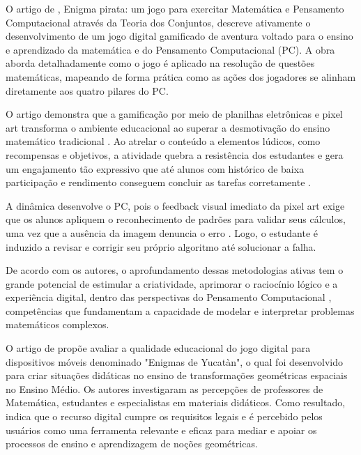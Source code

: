 O artigo de \cite{lais2023}, Enigma pirata: um jogo para exercitar Matemática e Pensamento
Computacional através da Teoria dos Conjuntos, descreve ativamente o
desenvolvimento de um jogo digital gamificado de aventura voltado para o ensino
e aprendizado da matemática e do Pensamento Computacional (PC). A obra aborda
detalhadamente como o jogo é aplicado na resolução de questões matemáticas,
mapeando de forma prática como as ações dos jogadores se alinham diretamente aos
quatro pilares do PC.

O artigo demonstra que a gamificação por meio de planilhas eletrônicas e pixel
art transforma o ambiente educacional ao superar a desmotivação do ensino
matemático tradicional \cite{teodosio2023atividade}. Ao atrelar o conteúdo a
elementos lúdicos, como recompensas e objetivos, a atividade quebra a
resistência dos estudantes e gera um engajamento tão expressivo que até alunos
com histórico de baixa participação e rendimento conseguem concluir as tarefas
corretamente \cite{teodosio2023atividade}.

A dinâmica desenvolve o PC, pois o feedback visual imediato da pixel art exige
que os alunos apliquem o reconhecimento de padrões para validar seus cálculos,
uma vez que a ausência da imagem denuncia o erro \cite{teodosio2023atividade}.
Logo, o estudante é induzido a revisar e corrigir seu próprio algoritmo até
solucionar a falha.

De acordo com os autores, o aprofundamento dessas metodologias ativas tem o
grande potencial de estimular a criatividade, aprimorar o raciocínio lógico e a
experiência digital, dentro das perspectivas do Pensamento Computacional
\cite{teodosio2023atividade}, competências que fundamentam a capacidade de
modelar e interpretar problemas matemáticos complexos.

O artigo de \cite{queiros2022enigmas} propõe avaliar a qualidade educacional do jogo
digital para dispositivos móveis denominado "Enigmas de Yucatàn", o qual foi
desenvolvido para criar situações didáticas no ensino de transformações
geométricas espaciais no Ensino Médio. Os autores investigaram as percepções de
professores de Matemática, estudantes e especialistas em materiais didáticos.
Como resultado, \cite{queiros2022enigmas} indica que o recurso digital cumpre os requisitos legais
e é percebido pelos usuários como uma ferramenta relevante e eficaz para mediar
e apoiar os processos de ensino e aprendizagem de noções  geométricas.